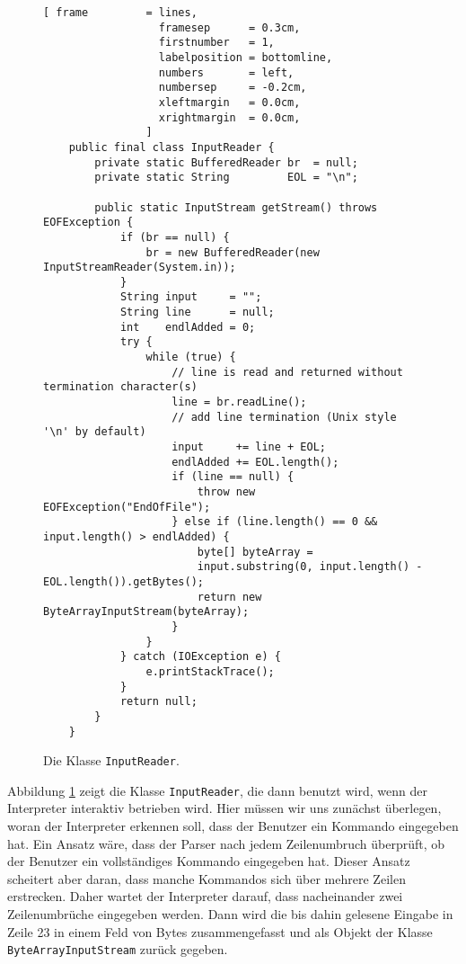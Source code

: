 \begin{figure}[!ht]
\centering
\begin{Verbatim}[ frame         = lines, 
                  framesep      = 0.3cm, 
                  firstnumber   = 1,
                  labelposition = bottomline,
                  numbers       = left,
                  numbersep     = -0.2cm,
                  xleftmargin   = 0.0cm,
                  xrightmargin  = 0.0cm,
                ]
    public final class InputReader {
        private static BufferedReader br  = null;
        private static String         EOL = "\n";
    
        public static InputStream getStream() throws EOFException {
            if (br == null) {
                br = new BufferedReader(new InputStreamReader(System.in));
            }
            String input     = "";
            String line      = null;
            int    endlAdded = 0;
            try {
                while (true) {
                    // line is read and returned without termination character(s)
                    line = br.readLine();
                    // add line termination (Unix style '\n' by default)
                    input     += line + EOL;   
                    endlAdded += EOL.length();
                    if (line == null) {
                        throw new EOFException("EndOfFile");
                    } else if (line.length() == 0 && input.length() > endlAdded) {
                        byte[] byteArray = 
                        input.substring(0, input.length() - EOL.length()).getBytes();
                        return new ByteArrayInputStream(byteArray);
                    }
                }
            } catch (IOException e) {
                e.printStackTrace();
            }
            return null;
        }
    }
\end{Verbatim}
\vspace*{-0.3cm}
\caption{Die Klasse \texttt{InputReader}.}
\label{fig:InputReader.java}
\end{figure}

Abbildung \ref{fig:InputReader.java} zeigt die Klasse \texttt{InputReader}, die dann benutzt wird,
wenn der Interpreter interaktiv betrieben wird.  Hier m\"ussen wir uns zun\"achst \"uberlegen, woran der
Interpreter erkennen soll, dass der Benutzer ein Kommando eingegeben hat.  Ein Ansatz w\"are, dass der
Parser nach jedem Zeilenumbruch \"uberpr\"uft, ob der Benutzer ein vollst\"andiges Kommando eingegeben
hat.  Dieser Ansatz scheitert aber daran, dass manche Kommandos sich \"uber mehrere Zeilen
erstrecken.  Daher wartet der Interpreter darauf, dass nacheinander zwei Zeilenumbr\"uche eingegeben
werden.  Dann wird die bis dahin gelesene Eingabe in Zeile 23 in einem Feld von Bytes
zusammengefasst und als Objekt der Klasse \texttt{ByteArrayInputStream} zur\"uck gegeben.


